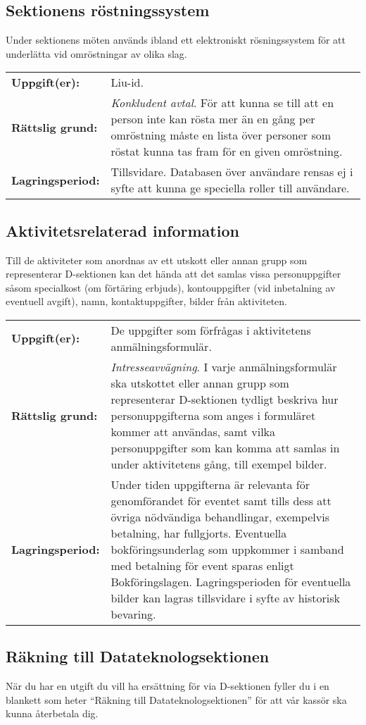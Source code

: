 \documentclass{datateknologsektionen-document}
\begin{document}
\subsection{Sektionens röstningssystem}
Under sektionens möten används ibland ett elektroniskt rösningssystem för att underlätta vid omröstningar av olika slag.

\begin{longtabu}{l X}
  \textbf{Uppgift(er):}    & Liu-id.\\
  \textbf{Rättslig grund:} & \textit{Konkludent avtal}. För att kunna se till att en person inte kan rösta mer än en gång per omröstning måste en lista över personer som röstat kunna tas fram för en given omröstning. \\
  \textbf{Lagringsperiod:} & Tillsvidare. Databasen över användare rensas ej i syfte att kunna ge speciella roller till användare.
\end{longtabu}

\subsection{Aktivitetsrelaterad information}
Till de aktiviteter som anordnas av ett utskott eller annan grupp som representerar D-sektionen kan det hända att det samlas vissa personuppgifter såsom specialkost (om förtäring erbjuds), kontouppgifter (vid inbetalning av eventuell avgift), namn, kontaktuppgifter, bilder från aktiviteten.

\begin{longtabu}{l X}
  \textbf{Uppgift(er):}    & De uppgifter som förfrågas i aktivitetens anmälningsformulär. \\
  \textbf{Rättslig grund:} & \textit{Intresseavvägning}. I varje anmälningsformulär ska utskottet eller annan grupp som representerar D-sektionen tydligt beskriva hur personuppgifterna som anges i formuläret kommer att användas, samt vilka personuppgifter som kan komma att samlas in under aktivitetens gång, till exempel bilder. \\
  \textbf{Lagringsperiod:} & Under tiden uppgifterna är relevanta för genomförandet för eventet samt tills dess att övriga nödvändiga behandlingar, exempelvis betalning, har fullgjorts. Eventuella bokföringsunderlag som uppkommer i samband med betalning för event sparas enligt Bokföringslagen. Lagringsperioden för eventuella bilder kan lagras tillsvidare i syfte av historisk bevaring.
\end{longtabu}

\subsection{Räkning till Datateknologsektionen}
När du har en utgift du vill ha ersättning för via D-sektionen fyller du i en blankett som heter ``Räkning till Datateknologsektionen'' för att vår kassör ska kunna återbetala dig.
\end{document}
